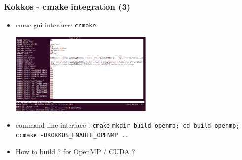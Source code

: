 \begin{frame}[fragile=singleslide]
  \frametitle{Kokkos - cmake integration (3)}

  \begin{itemize}
  \item curse gui interface: \texttt{ccmake}
    \begin{center}
      \includegraphics[width=7cm]{images/ccmake_kokkos}
    \end{center}
  \item command line interface : \texttt{cmake}
    \texttt{mkdir build\_openmp; cd build\_openmp; ccmake -DKOKKOS\_ENABLE\_OPENMP ..}
  \item How to build ? for OpenMP / CUDA ?
  \end{itemize}

\end{frame}

